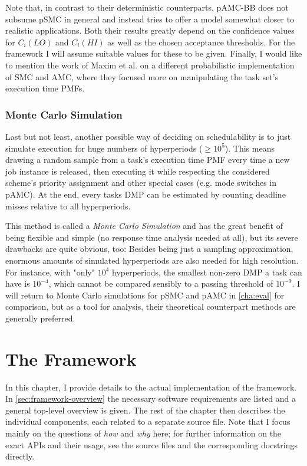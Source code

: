 \documentclass[a4paper,oneside]{csthesis}
\begin{document}
Note that, in contrast to their deterministic counterparts, pAMC-BB does not subsume pSMC in general and instead tries to offer a model somewhat closer to realistic applications. Both their results greatly depend on the confidence values for $C_i(LO)$ and $C_i(HI)$ as well as the chosen acceptance thresholds. For the framework I will assume suitable values for these to be given. Finally, I would like to mention the work of Maxim et al. \cite{maxim2016probabilistic} on a different probabilistic implementation of SMC and AMC, where they focused more on manipulating the task set's execution time PMFs.


\subsection{Monte Carlo Simulation}
\label{subsec:monte-carlo-schemes}
Last but not least, another possible way of deciding on schedulability is to just simulate execution for huge numbers of hyperperiods ($\geq 10^5$). This means drawing a random sample from a task's execution time PMF every time a new job instance is released, then executing it while respecting the considered scheme's priority assignment and other special cases (e.g. mode switches in pAMC). At the end, every tasks DMP can be estimated by counting deadline misses relative to all hyperperiods. 

This method is called a \textit{Monte Carlo Simulation} and has the great benefit of being flexible and simple (no response time analysis needed at all), but its severe drawbacks are quite obvious, too: Besides being just a sampling approximation, enormous amounts of simulated hyperperiods are also needed for high resolution. For instance, with "only" $10^4$ hyperperiods, the smallest non-zero DMP a task can have is $10^{-4}$, which cannot be compared sensibly to a passing threshold of $10^{-9}$. I will return to Monte Carlo simulations for pSMC and pAMC in \cref{cha:eval} for comparison, but as a tool for analysis, their theoretical counterpart methods are generally preferred.

\chapter{The Framework}
\label{cha:framework}
In this chapter, I provide details to the actual implementation of the framework. In \cref{sec:framework-overview} the necessary software requirements are listed and a general top-level overview is given. The rest of the chapter then describes the individual components, each related to a separate source file. Note that I focus mainly on the questions of \textit{how} and \textit{why} here; for further information on the exact APIs and their usage, see the source files and the corresponding docstrings directly.
\end{document}
